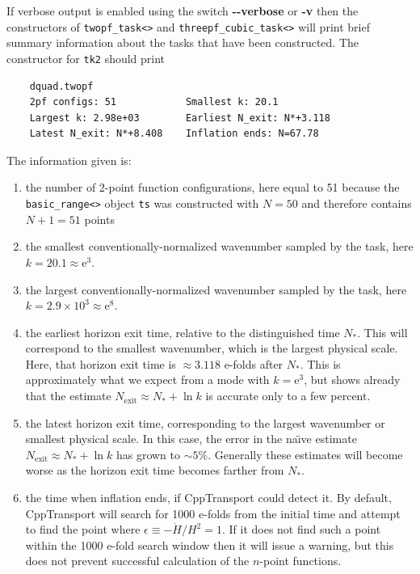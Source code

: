 \documentclass[11pt,a4paper]{article}
\newcommand{\e}[1]{\mathrm{e}^{{#1}}}
\newcommand{\Nexit}{N_{\text{exit}}}
\newcommand{\Nstar}{N_{\ast}}
\newcommand{\packagefont}{\sffamily}
\newcommand{\CppTransport}{{\packagefont CppTransport}}
\newcommand{\option}[1]{{\ttfamily\bfseries\small #1}}
\begin{document}
If verbose output is enabled using the switch
\option{{-}{-}verbose}
or
\option{-v}
then the constructors of
\texttt{twopf_task<>}
and \texttt{threepf_cubic_task<>}
will print brief summary information about the
tasks that have been constructed.
The constructor for \texttt{tk2}
should print
\begin{verbatim}
    dquad.twopf
    2pf configs: 51            Smallest k: 20.1           
    Largest k: 2.98e+03        Earliest N_exit: N*+3.118  
    Latest N_exit: N*+8.408    Inflation ends: N=67.78   
\end{verbatim}
The information given is:
\begin{enumerate}
    \item the number of 2-point function configurations, here
    equal to 51 because the
    \texttt{basic_range<>} object \texttt{ts}
    was constructed with $N=50$ and therefore contains $N+1 = 51$
    points
    
    \item the smallest conventionally-normalized wavenumber sampled by
    the task, here
    $k = 20.1 \approx \e{3}$.
    
    \item the largest conventionally-normalized wavenumber sampled by
    the task, here
    $k = 2.9 \times 10^3 \approx \e{8}$.
    
    \item the earliest horizon exit time, relative to the distinguished
    time $\Nstar$. This will correspond to the smallest wavenumber,
    which is the largest physical scale.
    Here, that horizon exit time is $\approx 3.118$ e-folds after
    $\Nstar$.
    This is approximately what we expect from a mode with
    $k = \e{3}$, but shows already that
    the estimate $\Nexit \approx \Nstar + \ln k$
    is accurate only to a few percent.
    
    \item the latest horizon exit time, corresponding to the largest
    wavenumber or smallest physical scale.
    In this case, the error in the na\"{\i}ve estimate
    $\Nexit \approx \Nstar + \ln k$ has grown to $\sim 5\%$.
    Generally these estimates will become worse as the horizon
    exit time becomes farther from $\Nstar$.
    
    \item the time when inflation ends, if {\CppTransport}
    could detect it. By default, {\CppTransport} will search for
    1000 e-folds from the initial time
    and attempt to find the point where $\epsilon \equiv - \dot{H}/H^2 = 1$.
    If it does not find such a point within the 1000 e-fold search window
    then it will issue a warning, but this does not prevent
    successful calculation of the $n$-point functions.
\end{enumerate}
\end{document}
